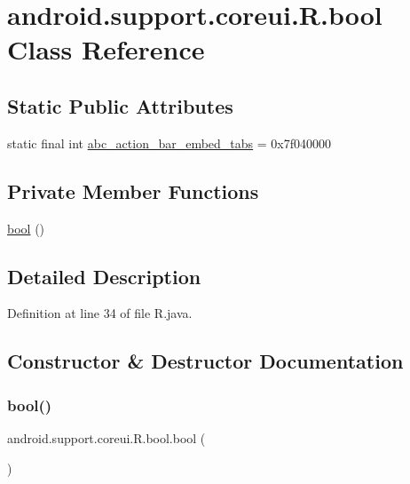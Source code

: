 \hypertarget{classandroid_1_1support_1_1coreui_1_1_r_1_1bool}{}\section{android.\+support.\+coreui.\+R.\+bool Class Reference}
\label{classandroid_1_1support_1_1coreui_1_1_r_1_1bool}
\subsection*{Static Public Attributes}
\begin{DoxyCompactItemize}
\item 
static final int \mbox{\hyperlink{classandroid_1_1support_1_1coreui_1_1_r_1_1bool_a8f4c5f52b403fce26b4e70370bf2e2d3}{abc\+\_\+action\+\_\+bar\+\_\+embed\+\_\+tabs}} = 0x7f040000
\end{DoxyCompactItemize}
\subsection*{Private Member Functions}
\begin{DoxyCompactItemize}
\item 
\mbox{\hyperlink{classandroid_1_1support_1_1coreui_1_1_r_1_1bool_aea68a81bc7efda2abacdb50812513cd5}{bool}} ()
\end{DoxyCompactItemize}


\subsection{Detailed Description}


Definition at line 34 of file R.\+java.



\subsection{Constructor \& Destructor Documentation}
\mbox{\label{classandroid_1_1support_1_1coreui_1_1_r_1_1bool_aea68a81bc7efda2abacdb50812513cd5}} 
\subsubsection{\texorpdfstring{bool()}{bool()}}
{\footnotesize\ttfamily android.\+support.\+coreui.\+R.\+bool.\+bool (\begin{DoxyParamCaption}{ }\end{DoxyParamCaption})\hspace{0.3cm}{\ttfamily [private]}}



